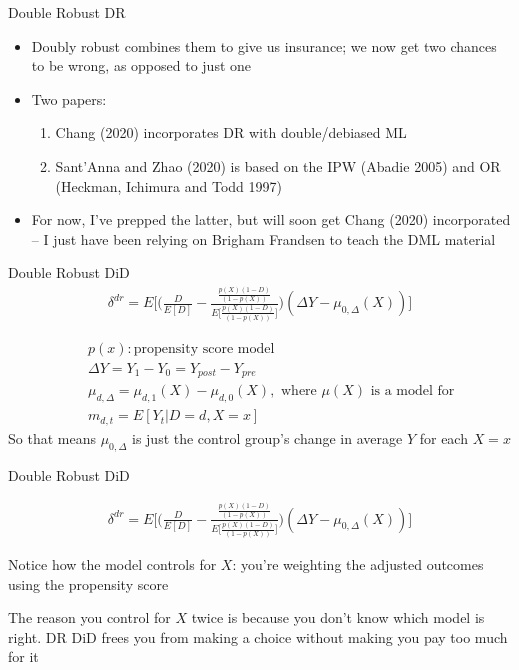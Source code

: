 \documentclass{beamer}
\begin{document}
\begin{frame}{Double Robust DR}

\begin{itemize}
\item Doubly robust combines them to give us insurance; we now get two chances to be wrong, as opposed to just one
\item Two papers:
	\begin{enumerate}
	\item Chang (2020) incorporates DR with double/debiased ML
	\item Sant'Anna and Zhao (2020) is based on the IPW (Abadie 2005) and OR (Heckman, Ichimura and Todd 1997)
	\end{enumerate}
\item For now, I've prepped the latter, but will soon get Chang (2020) incorporated -- I just have been relying on Brigham Frandsen to teach the DML material
\end{itemize}

\end{frame}



\begin{frame}{Double Robust DiD}
\begin{eqnarray*}
\delta^{dr} = E \bigg [ \bigg ( \frac{D}{E[D]} -\frac{ \frac{p(X)(1-D)}{(1-p(X))} }{E \bigg [\frac{p(X)(1-D)}{(1-p(X))} \bigg ]} \bigg  )( \Delta Y - \mu_{0,\Delta}(X)) \bigg ]
\end{eqnarray*}

\begin{eqnarray*}
&&p(x): \text{propensity score model} \\
&& \Delta Y = Y_1 - Y_0 = Y_{post} - Y_{pre} \\
&& \mu_{d,\Delta} = \mu_{d,1}(X) - \mu_{d,0}(X), \text{ where } \mu(X) \text{ is a model for} \\
&& m_{d,t} = E[Y_t|D=d,X=x]
\end{eqnarray*}So that means $\mu_{0,\Delta}$ is just the control group's change in average $Y$ for each $X=x$

\end{frame}

\begin{frame}{Double Robust DiD}

\begin{eqnarray*}
\delta^{dr} = E \bigg [ \bigg ( \frac{D}{E[D]} -\frac{ \frac{p(X)(1-D)}{(1-p(X))} }{E \bigg [\frac{p(X)(1-D)}{(1-p(X))} \bigg ]} \bigg  )( \Delta Y - \mu_{0,\Delta}(X)) \bigg ]
\end{eqnarray*}

Notice how the model controls for $X$: you're weighting the adjusted outcomes using the propensity score

\bigskip

The reason you control for $X$ twice is because you don't know which model is right.  DR DiD frees you from making a choice without making you pay too much for it


\end{frame}
\end{document}
